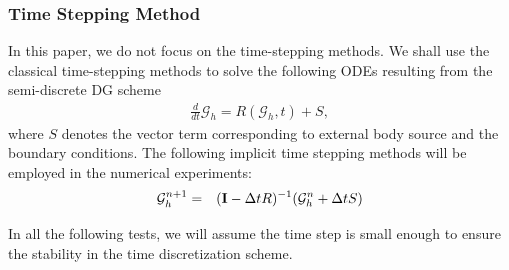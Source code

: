 \documentclass[preprint,11pt]{elsarticle}
\begin{document}
\subsubsection{Time Stepping Method}
\label{sec:time_stepping}
In this paper, we do not focus on the time-stepping methods.   
We shall use the classical time-stepping methods to solve the following ODEs resulting from the semi-discrete DG scheme 
%
\begin{eqnarray}
   \frac{d}{dt}\mathcal{G}_h=R(\mathcal{G}_h,t)+S,
\end{eqnarray}
%
where $S$ denotes the vector term corresponding to external body source and the boundary conditions. The following implicit time stepping methods will be employed in the numerical experiments:
    \begin{eqnarray}
     \mathcal{G}_h^{n+1}&=& (\text{\bf I}-\Delta t R)^{-1}(\mathcal{G}_h^{n}+\Delta t S)
    \end{eqnarray}

In all the following tests, we will assume the time step is small enough to ensure the stability in the time discretization scheme.
\end{document}

